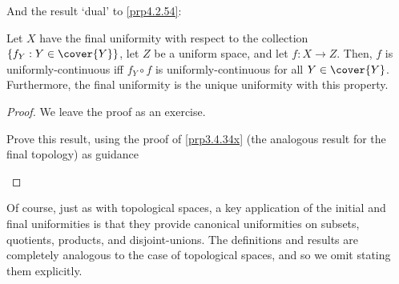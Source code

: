 And the result `dual' to \cref{prp4.2.54}:
\begin{prp}{}{}
Let $X$ have the final uniformity with respect to the collection $\{ f_Y:Y\in \cover{Y}\}$, let $Z$ be a uniform space, and let $f\colon X\rightarrow Z$.  Then, $f$ is uniformly-continuous iff $f_Y\circ f$ is uniformly-continuous for all $Y\in \cover{Y}$.  Furthermore, the final uniformity is the unique uniformity with this property.
\begin{proof}
We leave the proof as an exercise.
\begin{exr}[breakable=false]{}{}
Prove this result, using the proof of \cref{prp3.4.34x} (the analogous result for the final topology) as guidance 
\end{exr}
\end{proof}
\end{prp}
Of course, just as with topological spaces, a key application of the initial and final uniformities is that they provide canonical uniformities on subsets, quotients, products, and disjoint-unions.  The definitions and results are completely analogous to the case of topological spaces, and so we omit stating them explicitly.

